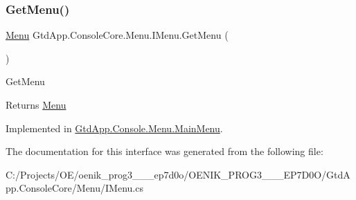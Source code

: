 \subsubsection{\texorpdfstring{Get\+Menu()}{GetMenu()}}
{\footnotesize\ttfamily \mbox{\hyperlink{class_gtd_app_1_1_console_core_1_1_menu_1_1_menu}{Menu}} Gtd\+App.\+Console\+Core.\+Menu.\+I\+Menu.\+Get\+Menu (\begin{DoxyParamCaption}{ }\end{DoxyParamCaption})}



Get\+Menu 

\begin{DoxyReturn}{Returns}
\mbox{\hyperlink{class_gtd_app_1_1_console_core_1_1_menu_1_1_menu}{Menu}}
\end{DoxyReturn}


Implemented in \mbox{\hyperlink{class_gtd_app_1_1_console_1_1_menu_1_1_main_menu_a1b91b88838b55c7d929ac2d41ec97643}{Gtd\+App.\+Console.\+Menu.\+Main\+Menu}}.



The documentation for this interface was generated from the following file\+:\begin{DoxyCompactItemize}
\item 
C\+:/\+Projects/\+O\+E/oenik\+\_\+prog3\+\_\+\_\+\_\+ep7d0o/\+O\+E\+N\+I\+K\+\_\+\+P\+R\+O\+G3\+\_\+\_\+\_\+\+E\+P7\+D0\+O/\+Gtd\+App.\+Console\+Core/\+Menu/I\+Menu.\+cs\end{DoxyCompactItemize}
